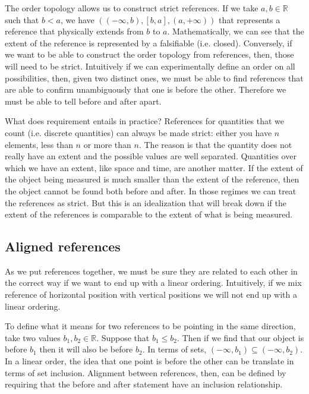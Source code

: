 \documentclass[12pt]{iopart}
\begin{document}
The order topology allows us to construct strict references. If we take $a,b \in \mathbb{R}$ such that $b<a$, we have $( (-\infty, b), [b, a], (a, +\infty) )$ that represents a reference that physically extends from $b$ to $a$. Mathematically, we can see that the extent of the reference is represented by a falsifiable (i.e. closed). Conversely, if we want to be able to construct the order topology from references, then, those will need to be strict. Intuitively if we can experimentally define an order on all possibilities, then, given two distinct ones, we must be able to find references that are able to confirm unambiguously that one is before the other. Therefore we must be able to tell before and after apart.

What does requirement entails in practice? References for quantities that we count (i.e. discrete quantities) can always be made strict: either you have $n$ elements, less than $n$ or more than $n$. The reason is that the quantity does not really have an extent and the possible values are well separated. Quantities over which we have an extent, like space and time, are another matter. If the extent of the object being measured is much smaller than the extent of the reference, then the object cannot be found both before and after. In those regimes we can treat the references as strict. But this is an idealization that will break down if the extent of the references is comparable to the extent of what is being measured.

\subsection{Aligned references}

As we put references together, we must be sure they are related to each other in the correct way if we want to end up with a linear ordering. Intuitively, if we mix reference of horizontal position with vertical positions we will not end up with a linear ordering.

To define what it means for two references to be pointing in the same direction, take two values $b_1, b_2 \in \mathbb{R}$. Suppose that $b_1 \leq b_2$. Then if we find that our object is before $b_1$ then it will also be before $b_2$. In terms of sets, $(-\infty, b_1) \subseteq (-\infty, b_2)$. In a linear order, the idea that one point is before the other can be translate in terms of set inclusion. Alignment between references, then, can be defined by requiring that the before and after statement have an inclusion relationship.
\end{document}
